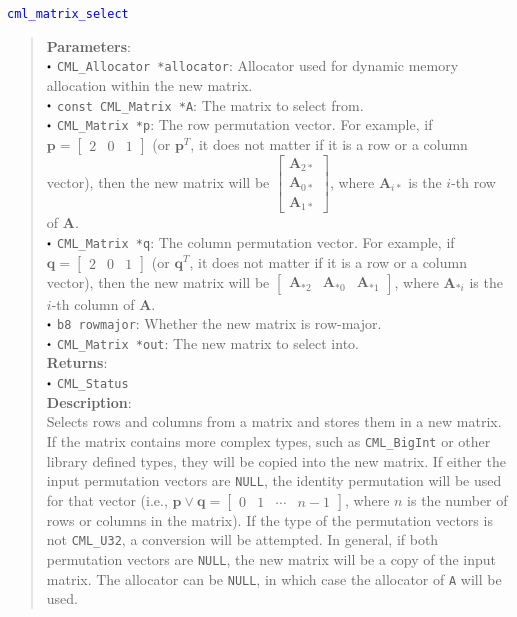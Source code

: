 \documentclass[a4paper,oneside,8pt]{extarticle}
\newcommand{\function}[1]{
  \noindent\textcolor{blue}{\texttt{#1}}
  \vspace{-0.3em}
}
\renewcommand{\dot}{\raisebox{0.3ex}{\scalebox{0.6}{$\bullet$}}}
\theoremstyle{definition}
\begin{document}
\function{cml\_matrix\_select}
\begin{quote}
  \textbf{Parameters}: \\
  $\dot$ \texttt{CML\_Allocator *allocator}: Allocator used for dynamic memory allocation within the new matrix. \\
  $\dot$ \texttt{const CML\_Matrix *A}: The matrix to select from. \\
  $\dot$ \texttt{CML\_Matrix *p}: The row permutation vector. For example, if $\mathbf{p} = \begin{bmatrix} 2 & 0 & 1 \end{bmatrix}$ (or $\mathbf{p}^T$, it does not matter if it is a row or a column vector), then the new matrix will be $\begin{bmatrix} \mathbf{A}_{2\ast} \\ \mathbf{A}_{0\ast} \\ \mathbf{A}_{1\ast} \end{bmatrix}$, where $\mathbf{A}_{i\ast}$ is the $i$-th row of $\mathbf{A}$. \\
  $\dot$ \texttt{CML\_Matrix *q}: The column permutation vector. For example, if $\mathbf{q} = \begin{bmatrix} 2 & 0 & 1 \end{bmatrix}$ (or $\mathbf{q}^T$, it does not matter if it is a row or a column vector), then the new matrix will be $\begin{bmatrix} \mathbf{A}_{\ast2} & \mathbf{A}_{\ast0} & \mathbf{A}_{\ast1} \end{bmatrix}$, where $\mathbf{A}_{\ast i}$ is the $i$-th column of $\mathbf{A}$. \\
  $\dot$ \texttt{b8 rowmajor}: Whether the new matrix is row-major. \\
  $\dot$ \texttt{CML\_Matrix *out}: The new matrix to select into. \\
  \textbf{Returns}: \\
  $\dot$ \texttt{CML\_Status} \\

  \vspace{-0.75em}
  \textbf{Description}: \\
  Selects rows and columns from a matrix and stores them in a new matrix. If the matrix contains more complex types, such as \texttt{CML\_BigInt} or other library defined types, they will be copied into the new matrix. If either the input permutation vectors are \texttt{NULL}, the identity permutation will be used for that vector (i.e., $\mathbf{p}\vee\mathbf{q} = \begin{bmatrix} 0 & 1 & \cdots & n-1 \end{bmatrix}$, where $n$ is the number of rows or columns in the matrix). If the type of the permutation vectors is not \texttt{CML\_U32}, a conversion will be attempted. In general, if both permutation vectors are \texttt{NULL}, the new matrix will be a copy of the input matrix. The allocator can be \texttt{NULL}, in which case the allocator of \texttt{A} will be used. \\


\end{quote}
\end{document}
